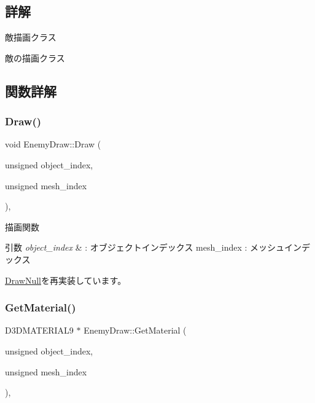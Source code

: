 \subsection{詳解}
敵描画クラス 

敵の描画クラス 

\subsection{関数詳解}
\mbox{\label{class_enemy_draw_a20a23c1c5fd5e510d15e8ca27aabd821}} 
\subsubsection{\texorpdfstring{Draw()}{Draw()}}
{\footnotesize\ttfamily void Enemy\+Draw\+::\+Draw (\begin{DoxyParamCaption}\item[{unsigned}]{object\+\_\+index,  }\item[{unsigned}]{mesh\+\_\+index }\end{DoxyParamCaption})\hspace{0.3cm}{\ttfamily [override]}, {\ttfamily [virtual]}}



描画関数 


\begin{DoxyParams}{引数}
{\em object\+\_\+index} & \+: オブジェクトインデックス mesh\+\_\+index \+: メッシュインデックス \\
\hline
\end{DoxyParams}


\mbox{\hyperlink{class_draw_null_afe50f6fd820b18d673f70f048743f339}{Draw\+Null}}を再実装しています。

\mbox{\label{class_enemy_draw_a12f00116f7fa97e07317a949d5c27bb4}} 
\subsubsection{\texorpdfstring{Get\+Material()}{GetMaterial()}}
{\footnotesize\ttfamily D3\+D\+M\+A\+T\+E\+R\+I\+A\+L9 $\ast$ Enemy\+Draw\+::\+Get\+Material (\begin{DoxyParamCaption}\item[{unsigned}]{object\+\_\+index,  }\item[{unsigned}]{mesh\+\_\+index }\end{DoxyParamCaption})\hspace{0.3cm}{\ttfamily [override]}, {\ttfamily [virtual]}}



